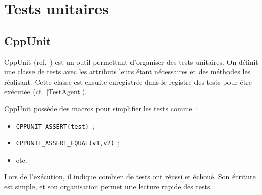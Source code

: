 \section{Tests unitaires}
\subsection{CppUnit}
CppUnit (ref.~\cite{CppUnit}) est un outil permettant d'organiser des tests unitaires.
On définit une classe de tests avec les attributs leurs étant nécessaires et des méthodes les réalisant. Cette classe est ensuite enregistrée dans le registre des tests pour être exécutée (cf.~\ref{TestAgent}).

CppUnit possède des macros pour simplifier les tests comme~:
\begin{itemize}
\item \verb|CPPUNIT_ASSERT(test)|~;
\item \verb|CPPUNIT_ASSERT_EQUAL(v1,v2)|~;
\item etc.
\end{itemize}

Lors de l'exécution, il indique combien de tests ont réussi et échoué.
Son écriture est simple, et son organisation permet une lecture rapide des tests.

